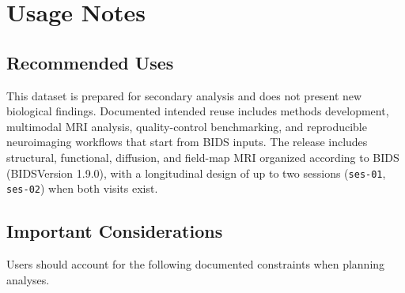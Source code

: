 \section{Usage Notes}
\label{sec:usage_notes}

\subsection{Recommended Uses}

This dataset is prepared for secondary analysis and does not present new biological findings.
Documented intended reuse includes methods development, multimodal MRI analysis, quality-control benchmarking, and reproducible neuroimaging workflows that start from BIDS inputs.
The release includes structural, functional, diffusion, and field-map MRI organized according to BIDS (BIDSVersion 1.9.0), with a longitudinal design of up to two sessions (\texttt{ses-01}, \texttt{ses-02}) when both visits exist.

\subsection{Important Considerations}

Users should account for the following documented constraints when planning analyses.

